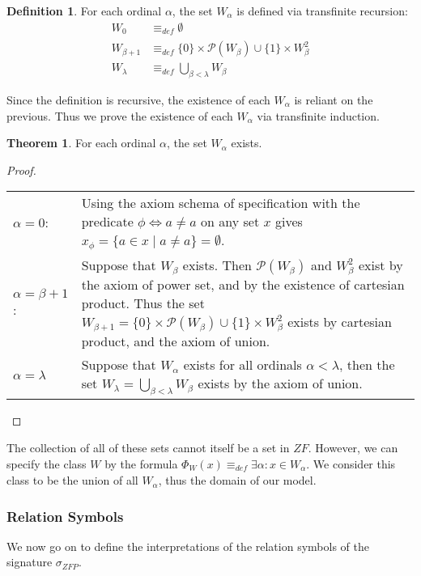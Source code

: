 \documentclass[11pt]{report}
\newcommand{\eqdef}{\equiv_\mathit{def}}
\theoremstyle{definition}
\theoremstyle{theorem}
\theoremstyle{lemma}
\newtheorem{definition}{Definition}[section]
\newtheorem{theorem}{Theorem}[section]
\begin{document}
\begin{definition} For each ordinal $\alpha$, the set $W_\alpha$ is defined via transfinite recursion:
\begin{align*}
 W_0 &\eqdef \emptyset\\
 W_{\beta+1} &\eqdef \{0\}\times\mathcal{P}(W_\beta) \cup \{1\}\times W_\beta^2\\
 W_\lambda &\eqdef \bigcup_{\beta < \lambda} W_\beta
\end{align*}
\end{definition}
\noindent
Since the definition is recursive, the existence of each $W_\alpha$ is reliant on the previous. Thus we prove the existence of each $W_\alpha$ via transfinite induction.

\begin{theorem} For each ordinal $\alpha$, the set $W_\alpha$ exists.
  \begin{proof} \hspace{1mm}\\
    \begin{tabular}{p{20mm} p{138mm}}
      $\alpha = 0$: \rule{0pt}{4ex} &
      Using the axiom schema of specification with the predicate $\phi \Leftrightarrow a \neq a$ on any set $x$ gives $x_\phi = \{a \in x \mid a \neq a \} = \emptyset$. \\
      $\alpha = \beta+1$: \rule{0pt}{4ex} &
      Suppose that $W_\beta$ exists. Then $\mathcal{P}(W_\beta)$ and $W_\beta^2$ exist by the axiom of power set, and by the existence of cartesian product. Thus the set $W_{\beta+1} = \{0\}\times\mathcal{P}(W_\beta) \cup \{1\}\times W_\beta^2$ exists by cartesian product, and the axiom of union. \\

      $\alpha = \lambda$ \rule{0pt}{4ex} &
      Suppose that $W_\alpha$ exists for all ordinals $\alpha<\lambda$, then the set $W_\lambda = \bigcup_{\beta < \lambda} W_\beta$ exists by the axiom of union.
    \end{tabular}
  \end{proof}
\end{theorem}
\noindent
The collection of all of these sets cannot itself be a set in $\mathit{ZF}$. However, we can specify the class $W$ by the formula $\Phi_W(x) \eqdef \exists \alpha: x\in W_\alpha$.
We consider this class to be the union of all $W_\alpha$, thus the domain of our model.

\subsubsection{Relation Symbols}
We now go on to define the interpretations of the relation symbols of the signature $\sigma_{\mathit{ZFP}}$.
\end{document}
